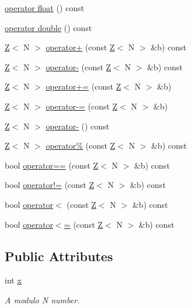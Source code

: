 \begin{DoxyCompactItemize}
\item 
\hyperlink{classZ_a9bb3636d1ffd75dc1a221251f71d4781}{operator float} () const
\item 
\hyperlink{classZ_a819290a913ce32272c6cdb7407846057}{operator double} () const
\item 
\hyperlink{classZ}{Z}$<$ N $>$ \hyperlink{classZ_a1a01f7aaa064fe201c2e0cc72da02960}{operator+} (const \hyperlink{classZ}{Z}$<$ N $>$ \&b) const
\item 
\hyperlink{classZ}{Z}$<$ N $>$ \hyperlink{classZ_ac4751d1ef56abaee7ed90f29939324f2}{operator-\/} (const \hyperlink{classZ}{Z}$<$ N $>$ \&b) const
\item 
\hyperlink{classZ}{Z}$<$ N $>$ \hyperlink{classZ_a3b61b86ccc14f54010c58e8ff2745d91}{operator+=} (const \hyperlink{classZ}{Z}$<$ N $>$ \&b)
\item 
\hyperlink{classZ}{Z}$<$ N $>$ \hyperlink{classZ_ad7620de459cf2248f9f02e51fc5b5350}{operator-\/=} (const \hyperlink{classZ}{Z}$<$ N $>$ \&b)
\item 
\hyperlink{classZ}{Z}$<$ N $>$ \hyperlink{classZ_a298e4392b981d2ce937823bb26cb7421}{operator-\/} () const
\item 
\hyperlink{classZ}{Z}$<$ N $>$ \hyperlink{classZ_a4715a86eb00c00fce2be3d1c1bf24440}{operator\%} (const \hyperlink{classZ}{Z}$<$ N $>$ \&b) const
\item 
bool \hyperlink{classZ_aee67aee77949c30eb8a0645d7248044c}{operator==} (const \hyperlink{classZ}{Z}$<$ N $>$ \&b) const
\item 
bool \hyperlink{classZ_a91a2c48fff9d0b4b11e3e7da09c68b7b}{operator!=} (const \hyperlink{classZ}{Z}$<$ N $>$ \&b) const
\item 
bool \hyperlink{classZ_ac9464cf14368b566bd4897b7a83d0861}{operator$<$} (const \hyperlink{classZ}{Z}$<$ N $>$ \&b) const
\item 
bool \hyperlink{classZ_a52b5a9afa8054c108b4967dfe2930642}{operator$<$=} (const \hyperlink{classZ}{Z}$<$ N $>$ \&b) const
\end{DoxyCompactItemize}
\subsection*{Public Attributes}
\begin{DoxyCompactItemize}
\item 
int \hyperlink{classZ_a81f004f23dff9772403dd7a4452ad3c6}{x}
\begin{DoxyCompactList}\small\item\em A modulo N number. \end{DoxyCompactList}\end{DoxyCompactItemize}
